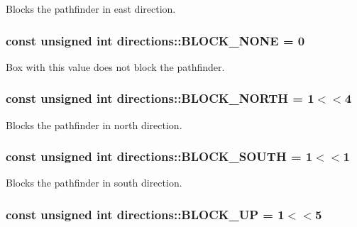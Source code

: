 Blocks the pathfinder in east direction. \hypertarget{namespacedirections_afb925db0683d3de68b06587ccc1be620}{
\subsubsection[{B\-L\-O\-C\-K\-\_\-\-N\-O\-N\-E}]{\setlength{\rightskip}{0pt plus 5cm}const unsigned int directions\-::\-B\-L\-O\-C\-K\-\_\-\-N\-O\-N\-E = 0}}\label{namespacedirections_afb925db0683d3de68b06587ccc1be620}
Box with this value does not block the pathfinder. \hypertarget{namespacedirections_aafa10fc7e4d258d59153b41e0c3c3972}{
\subsubsection[{B\-L\-O\-C\-K\-\_\-\-N\-O\-R\-T\-H}]{\setlength{\rightskip}{0pt plus 5cm}const unsigned int directions\-::\-B\-L\-O\-C\-K\-\_\-\-N\-O\-R\-T\-H = 1$<$$<$4}}\label{namespacedirections_aafa10fc7e4d258d59153b41e0c3c3972}
Blocks the pathfinder in north direction. \hypertarget{namespacedirections_a19a70e2862864e20ea8b52f15f18a4d4}{
\subsubsection[{B\-L\-O\-C\-K\-\_\-\-S\-O\-U\-T\-H}]{\setlength{\rightskip}{0pt plus 5cm}const unsigned int directions\-::\-B\-L\-O\-C\-K\-\_\-\-S\-O\-U\-T\-H = 1$<$$<$1}}\label{namespacedirections_a19a70e2862864e20ea8b52f15f18a4d4}
Blocks the pathfinder in south direction. \hypertarget{namespacedirections_a75d6cf52d7c325364a0288afdc7affd8}{
\subsubsection[{B\-L\-O\-C\-K\-\_\-\-U\-P}]{\setlength{\rightskip}{0pt plus 5cm}const unsigned int directions\-::\-B\-L\-O\-C\-K\-\_\-\-U\-P = 1$<$$<$5}}\label{namespacedirections_a75d6cf52d7c325364a0288afdc7affd8}
